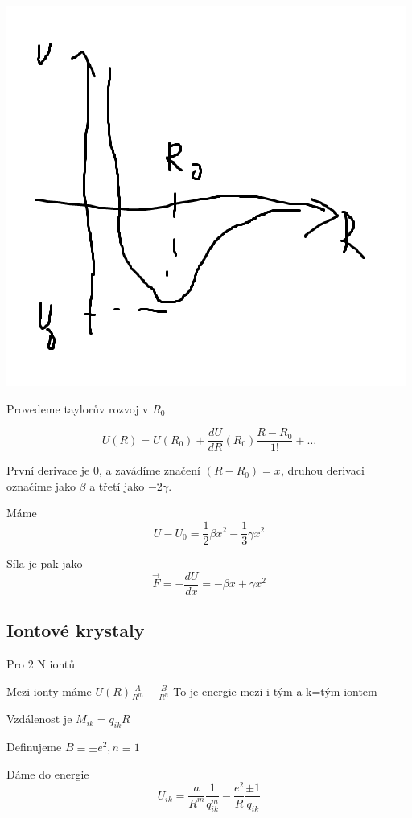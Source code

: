 \documentclass[../main.tex]{subfiles}
\begin{document}
\includegraphics[width=0.75\linewidth]{images/potencial.png}

Provedeme taylorův rozvoj v $R_0$

\begin{equation}
    U(R) = U(R_0) + \frac{d U}{dR}(R_0)\frac{R-R_0}{1!} + \dots
\end{equation}

První derivace je 0, a zavádíme značení $(R - R_0) = x$, druhou derivaci označíme jako $\beta$ a třetí jako $-2\gamma$.

Máme
\begin{equation}
    U - U_0 = \frac{1}{2}\beta x^2 - \frac{1}{3} \gamma x^2
\end{equation}

Síla je pak jako 
\begin{equation}
    \vec{F} = - \frac{d U}{dx} = -\beta x + \gamma x^2
\end{equation}


\subsection{Iontové krystaly}
Pro 2 N iontů

Mezi ionty máme
$U(R) \frac{A}{R^m} - \frac{B}{R^n} $
To je energie mezi i-tým a k=tým iontem

Vzdálenost je $M_{ik} = q_{ik}R$

Definujeme $B \equiv \pm e^2, n\equiv 1$

Dáme do energie 
\begin{equation}
    U_{ik} = \frac{a}{R^m} \frac{1}{q^m_{ik}} - \frac{e^2}{R} \frac{\pm1}{q_{ik}}
\end{equation}
\end{document}
